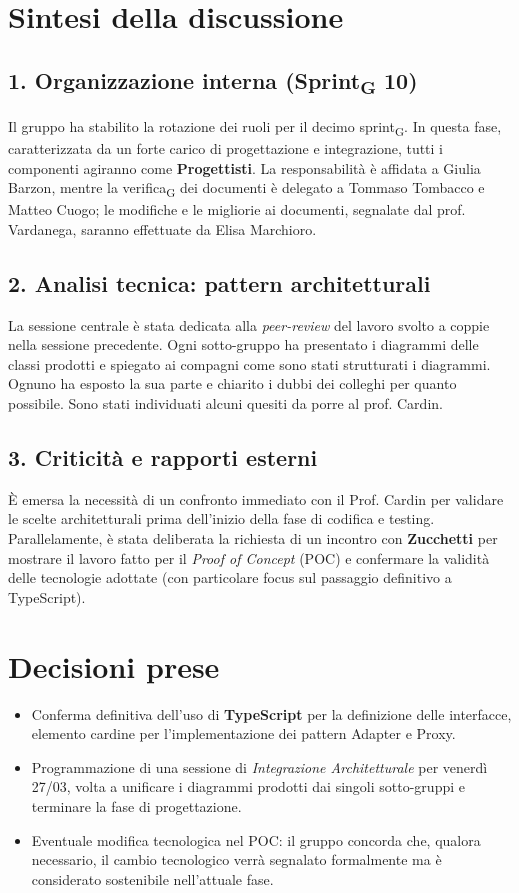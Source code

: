 \documentclass[a4paper,12pt]{article}
\newcommand{\gls}[1]{#1\textsubscript{G}}
\begin{document}
\section*{Sintesi della discussione}

\subsection*{1. Organizzazione interna (\gls{Sprint} 10)}
Il gruppo ha stabilito la rotazione dei ruoli per il decimo \gls{sprint}. In questa fase, caratterizzata da un forte carico di progettazione e integrazione, tutti i componenti agiranno come \textbf{Progettisti}. La responsabilità è affidata a Giulia Barzon, mentre la \gls{verifica} dei documenti è delegato a Tommaso Tombacco e Matteo Cuogo; le modifiche e le migliorie ai documenti, segnalate dal prof. Vardanega, saranno effettuate da Elisa Marchioro.

\subsection*{2. Analisi tecnica: pattern architetturali}
La sessione centrale è stata dedicata alla \textit{peer-review} del lavoro svolto a coppie nella sessione precedente. Ogni sotto-gruppo ha presentato i diagrammi delle classi prodotti e spiegato ai compagni come sono stati strutturati i diagrammi. Ognuno ha esposto la sua parte e chiarito i dubbi dei colleghi per quanto possibile. Sono stati individuati alcuni quesiti da porre al prof. Cardin.

\subsection*{3. Criticità e rapporti esterni}
È emersa la necessità di un confronto immediato con il Prof. Cardin per validare le scelte architetturali prima dell'inizio della fase di codifica e testing. Parallelamente, è stata deliberata la richiesta di un incontro con \textbf{Zucchetti} per mostrare il lavoro fatto per il \textit{Proof of Concept} (POC) e confermare la validità delle tecnologie adottate (con particolare focus sul passaggio definitivo a TypeScript).

\section*{Decisioni prese}
\begin{itemize}
    \item Conferma definitiva dell'uso di \textbf{TypeScript} per la definizione delle interfacce, elemento cardine per l'implementazione dei pattern Adapter e Proxy.
    \item  Programmazione di una sessione di \textit{Integrazione Architetturale} per venerdì 27/03, volta a unificare i diagrammi prodotti dai singoli sotto-gruppi e terminare la fase di progettazione.
    \item Eventuale modifica tecnologica nel POC: il gruppo concorda che, qualora necessario, il cambio tecnologico verrà segnalato formalmente ma è considerato sostenibile nell'attuale fase.
\end{itemize}
\end{document}
